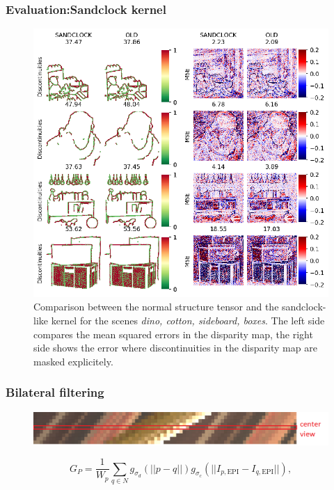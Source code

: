 \documentclass[11pt]{beamer}
\begin{document}
\begin{frame}
\frametitle{Evaluation:Sandclock kernel}
\begin{figure}
	\centering
	\includegraphics[width=0.7\linewidth]{images/sandclock_results}
	\caption[Results with custom sized kernel]{Comparison between the normal structure tensor and the sandclock- like kernel for the scenes \textit{dino, cotton, sideboard, boxes}. The left side compares the mean squared errors in the disparity map, the right side shows the error where discontinuities in the disparity map are masked explicitely.}
	\label{fig:sandclockresults}
\end{figure}
\end{frame}

\begin{frame}
\frametitle{Bilateral filtering}
\begin{figure}
	\centering
	\includegraphics[width=1\linewidth]{images/simple_epi}

\end{figure}
\begin{equation}\label{key}
G_P = \frac{1}{W_p}\sum_{q\in N} g_{\sigma_d}(||p-q||) g_{\sigma_c}(||I_{p, \text{EPI}}-I_{q, \text{EPI}}||),
\end{equation}
\end{frame}
\end{document}
